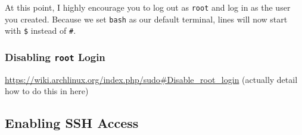 \documentclass[12pt,letterpaper]{article}
\begin{document}
At this point, I highly encourage you to log out as \lstinline{root} and log in as the user you created.  Because we set \lstinline{bash} as our default terminal, lines will now start with \lstinline{$} instead of \lstinline{#}.


\subsubsection{Disabling \lstinline{root} Login}

\url{https://wiki.archlinux.org/index.php/sudo#Disable_root_login} (actually detail how to do this in here)

\subsection{Enabling SSH Access}
\end{document}
